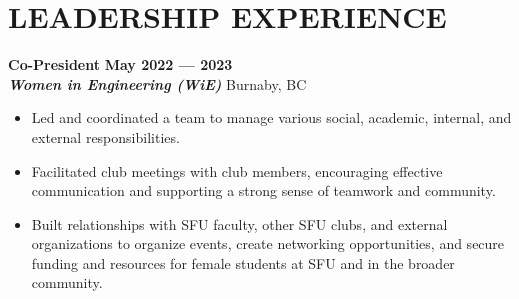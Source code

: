 \documentclass[letterpaper,11pt]{article}
\newcommand{\Item} [1] {
    \item\small{{#1 \vspace{-2pt}}}
}
\newcommand{\employer} [5] {
    {\textbf{#3} \hfill \textbf{#4 --- #5}\\ \textbf{\emph{#1}} \hfill #2\\}
}
\newcommand{\workItemListStart} [0] {
    \vspace{-1pt}
    \begin{itemize}[topsep=0pt,itemsep=-2pt]
}
\newcommand{\workItemListEnd} [0] {
    \end{itemize}
    \vspace{1pt}
}
\begin{document}
    \section{LEADERSHIP EXPERIENCE}
    \employer{Women in Engineering (WiE)}{Burnaby, BC}{Co-President}{May 2022}{2023}
    \workItemListStart{}
        \Item{Led and coordinated a team to manage various social, academic, internal, and external responsibilities.}
        \Item{Facilitated club meetings with club members, encouraging effective communication and supporting a strong sense of teamwork and community.}
        \Item{Built relationships with SFU faculty, other SFU clubs, and external organizations to organize events, create networking opportunities, and secure funding and resources for female students at SFU and in the broader community.}
    \workItemListEnd{}

\end{document}
